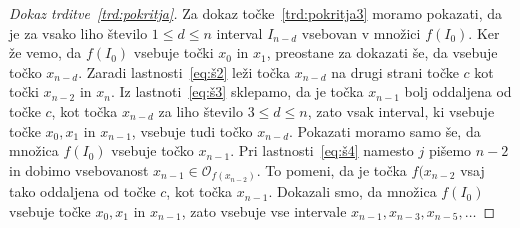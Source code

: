 \documentclass[../TG_magistrsko_delo_sections.tex]{subfiles}
\begin{document}
\begin{proof}[Dokaz trditve~\ref{trd:pokritja}]
Za dokaz točke~\ref{trd:pokritja3} moramo pokazati, da je za vsako liho število $1 \leq d \leq n$ interval $I_{n-d}$ vsebovan v množici $f(I_0)$.  
Ker že vemo, da $f(I_0)$ vsebuje točki $x_0$ in $x_1$, preostane za dokazati še, da vsebuje točko $x_{n-d}$. Zaradi lastnosti~\ref{eq:š2} leži točka $x_{n-d}$ na drugi strani točke $c$ kot točki $x_{n-2}$ in $x_n$. Iz lastnoti~\ref{eq:š3} sklepamo, da je točka $x_{n-1}$ bolj oddaljena od točke $c$, kot točka $x_{n-d}$ za liho število $3 \leq d \leq n$, zato vsak interval, ki vsebuje točke $x_0, x_1$ in $x_{n-1}$, vsebuje tudi točko $x_{n-d}$. Pokazati moramo samo še, da množica $f(I_0)$ vsebuje točko $x_{n-1}$. Pri lastnosti~\ref{eq:š4} namesto $j$ pišemo $n-2$ in dobimo vsebovanost $x_{n-1} \in \mathcal{O}_{f(x_{n-2})}$. To pomeni, da je točka $f(x_{n-2}$ vsaj tako oddaljena od točke $c$, kot točka $x_{n-1}$. Dokazali smo, da množica $f(I_0)$ vsebuje točke $x_0, x_1$ in $x_{n-1}$, zato vsebuje vse intervale $x_{n-1}, x_{n-3}, x_{n-5}, \dots$
\end{proof}
\end{document}
